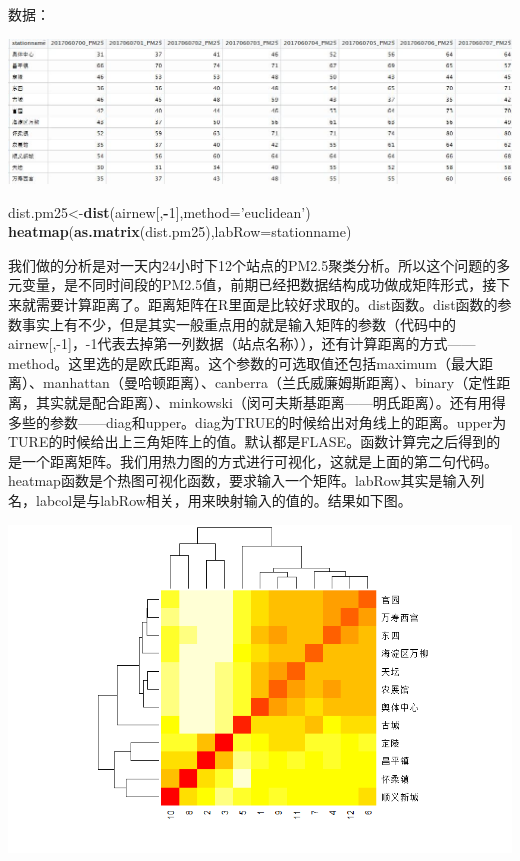 \documentclass[]{ctexbook}
\newenvironment{Shaded}{\begin{snugshade}}{\end{snugshade}}
\newcommand{\DataTypeTok}[1]{\textcolor[rgb]{0.13,0.29,0.53}{#1}}
\newcommand{\DecValTok}[1]{\textcolor[rgb]{0.00,0.00,0.81}{#1}}
\newcommand{\KeywordTok}[1]{\textcolor[rgb]{0.13,0.29,0.53}{\textbf{#1}}}
\newcommand{\NormalTok}[1]{#1}
\newcommand{\OperatorTok}[1]{\textcolor[rgb]{0.81,0.36,0.00}{\textbf{#1}}}
\newcommand{\StringTok}[1]{\textcolor[rgb]{0.31,0.60,0.02}{#1}}
\begin{document}
数据：

\includegraphics[width=1\linewidth,height=0.25\textheight]{fig/fig25}

\begin{Shaded}
\begin{Highlighting}[]
\NormalTok{dist.pm25<-}\KeywordTok{dist}\NormalTok{(airnew[,}\OperatorTok{-}\DecValTok{1}\NormalTok{],}\DataTypeTok{method=}\StringTok{'euclidean'}\NormalTok{)}
\KeywordTok{heatmap}\NormalTok{(}\KeywordTok{as.matrix}\NormalTok{(dist.pm25),}\DataTypeTok{labRow=}\NormalTok{stationname)}
\end{Highlighting}
\end{Shaded}

我们做的分析是对一天内24小时下12个站点的PM2.5聚类分析。所以这个问题的多元变量，是不同时间段的PM2.5值，前期已经把数据结构成功做成矩阵形式，接下来就需要计算距离了。距离矩阵在R里面是比较好求取的。dist函数。dist函数的参数事实上有不少，但是其实一般重点用的就是输入矩阵的参数（代码中的airnew{[},-1{]}，-1代表去掉第一列数据（站点名称）），还有计算距离的方式------method。这里选的是欧氏距离。这个参数的可选取值还包括maximum（最大距离）、manhattan（曼哈顿距离）、canberra（兰氏威廉姆斯距离）、binary（定性距离，其实就是配合距离）、minkowski（闵可夫斯基距离------明氏距离）。还有用得多些的参数------diag和upper。diag为TRUE的时候给出对角线上的距离。upper为TURE的时候给出上三角矩阵上的值。默认都是FLASE。函数计算完之后得到的是一个距离矩阵。我们用热力图的方式进行可视化，这就是上面的第二句代码。heatmap函数是个热图可视化函数，要求输入一个矩阵。labRow其实是输入列名，labcol是与labRow相关，用来映射输入的值的。结果如下图。

\includegraphics[width=1\linewidth,height=0.4\textheight]{fig/fig26}
\end{document}
